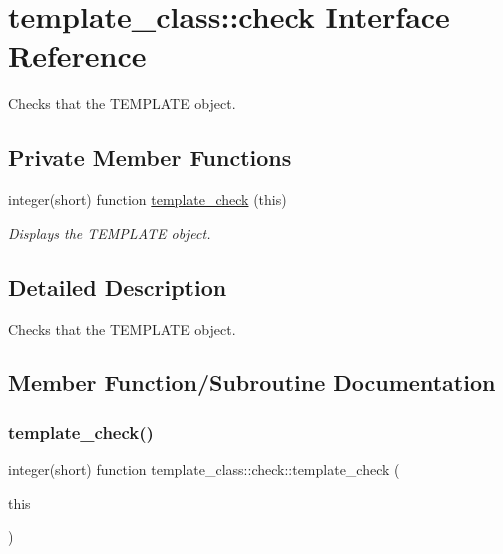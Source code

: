 \hypertarget{interfacetemplate__class_1_1check}{}\section{template\+\_\+class\+:\+:check Interface Reference}
\label{interfacetemplate__class_1_1check}


Checks that the T\+E\+M\+P\+L\+A\+TE object.  


\subsection*{Private Member Functions}
\begin{DoxyCompactItemize}
\item 
integer(short) function \hyperlink{interfacetemplate__class_1_1check_aad08be82f9ea98602fed47523c5d5fa7}{template\+\_\+check} (this)
\begin{DoxyCompactList}\small\item\em Displays the T\+E\+M\+P\+L\+A\+TE object. \end{DoxyCompactList}\end{DoxyCompactItemize}


\subsection{Detailed Description}
Checks that the T\+E\+M\+P\+L\+A\+TE object. 

\subsection{Member Function/\+Subroutine Documentation}
\mbox{\label{interfacetemplate__class_1_1check_aad08be82f9ea98602fed47523c5d5fa7}} 
\subsubsection{\texorpdfstring{template\+\_\+check()}{template\_check()}}
{\footnotesize\ttfamily integer(short) function template\+\_\+class\+::check\+::template\+\_\+check (\begin{DoxyParamCaption}\item[{type(\hyperlink{structtemplate__class_1_1template}{template}), intent(in)}]{this }\end{DoxyParamCaption})\hspace{0.3cm}{\ttfamily [private]}}



